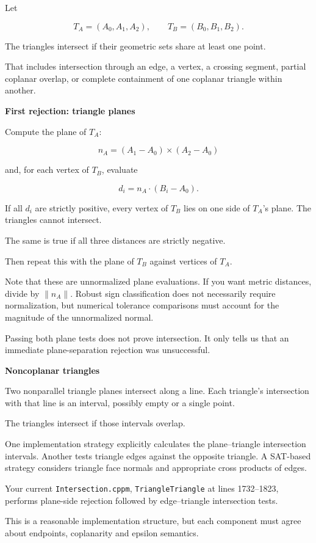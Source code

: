 Let

\[
T_A=(A_0,A_1,A_2),\qquad T_B=(B_0,B_1,B_2).
\]

The triangles intersect if their geometric sets share at least one point.

That includes intersection through an edge, a vertex, a crossing segment, partial coplanar overlap, or complete containment of one coplanar triangle within another.

\textbf{First rejection: triangle planes}

Compute the plane of \(T_A\):

\[
n_A=(A_1-A_0)\times(A_2-A_0)
\]

and, for each vertex of \(T_B\), evaluate

\[
d_i=n_A\cdot(B_i-A_0).
\]

If all \(d_i\) are strictly positive, every vertex of \(T_B\) lies on one side of \(T_A\)'s plane. The triangles cannot intersect.

The same is true if all three distances are strictly negative.

Then repeat this with the plane of \(T_B\) against vertices of \(T_A\).

Note that these are unnormalized plane evaluations. If you want metric distances, divide by \(\|n_A\|\). Robust sign classification does not necessarily require normalization, but numerical tolerance comparisons must account for the magnitude of the unnormalized normal.

Passing both plane tests does not prove intersection. It only tells us that an immediate plane-separation rejection was unsuccessful.

\textbf{Noncoplanar triangles}

Two nonparallel triangle planes intersect along a line. Each triangle's intersection with that line is an interval, possibly empty or a single point.

The triangles intersect if those intervals overlap.

One implementation strategy explicitly calculates the plane--triangle intersection intervals. Another tests triangle edges against the opposite triangle. A SAT-based strategy considers triangle face normals and appropriate cross products of edges.

Your current \texttt{Intersection.cppm}, \texttt{TriangleTriangle} at lines 1732--1823, performs plane-side rejection followed by edge--triangle intersection tests.

This is a reasonable implementation structure, but each component must agree about endpoints, coplanarity and epsilon semantics.


